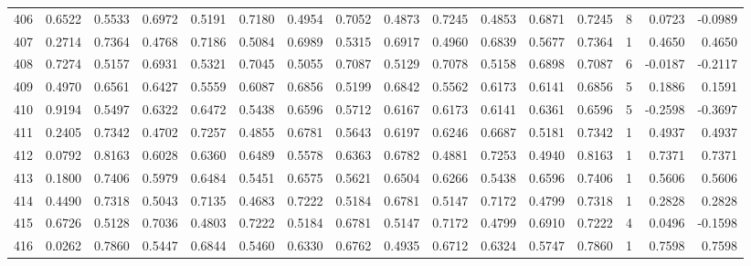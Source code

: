 \begin{tabular}{lrrrrrrrrrrrrrrr}
406 &      0.6522 &  0.5533 &  0.6972 &  0.5191 &  0.7180 &  0.4954 &  0.7052 &  0.4873 &  0.7245 &  0.4853 &   0.6871 &     0.7245 &      8 &                    0.0723 &                    -0.0989 \\
407 &      0.2714 &  0.7364 &  0.4768 &  0.7186 &  0.5084 &  0.6989 &  0.5315 &  0.6917 &  0.4960 &  0.6839 &   0.5677 &     0.7364 &      1 &                    0.4650 &                     0.4650 \\
408 &      0.7274 &  0.5157 &  0.6931 &  0.5321 &  0.7045 &  0.5055 &  0.7087 &  0.5129 &  0.7078 &  0.5158 &   0.6898 &     0.7087 &      6 &                   -0.0187 &                    -0.2117 \\
409 &      0.4970 &  0.6561 &  0.6427 &  0.5559 &  0.6087 &  0.6856 &  0.5199 &  0.6842 &  0.5562 &  0.6173 &   0.6141 &     0.6856 &      5 &                    0.1886 &                     0.1591 \\
410 &      0.9194 &  0.5497 &  0.6322 &  0.6472 &  0.5438 &  0.6596 &  0.5712 &  0.6167 &  0.6173 &  0.6141 &   0.6361 &     0.6596 &      5 &                   -0.2598 &                    -0.3697 \\
411 &      0.2405 &  0.7342 &  0.4702 &  0.7257 &  0.4855 &  0.6781 &  0.5643 &  0.6197 &  0.6246 &  0.6687 &   0.5181 &     0.7342 &      1 &                    0.4937 &                     0.4937 \\
412 &      0.0792 &  0.8163 &  0.6028 &  0.6360 &  0.6489 &  0.5578 &  0.6363 &  0.6782 &  0.4881 &  0.7253 &   0.4940 &     0.8163 &      1 &                    0.7371 &                     0.7371 \\
413 &      0.1800 &  0.7406 &  0.5979 &  0.6484 &  0.5451 &  0.6575 &  0.5621 &  0.6504 &  0.6266 &  0.5438 &   0.6596 &     0.7406 &      1 &                    0.5606 &                     0.5606 \\
414 &      0.4490 &  0.7318 &  0.5043 &  0.7135 &  0.4683 &  0.7222 &  0.5184 &  0.6781 &  0.5147 &  0.7172 &   0.4799 &     0.7318 &      1 &                    0.2828 &                     0.2828 \\
415 &      0.6726 &  0.5128 &  0.7036 &  0.4803 &  0.7222 &  0.5184 &  0.6781 &  0.5147 &  0.7172 &  0.4799 &   0.6910 &     0.7222 &      4 &                    0.0496 &                    -0.1598 \\
416 &      0.0262 &  0.7860 &  0.5447 &  0.6844 &  0.5460 &  0.6330 &  0.6762 &  0.4935 &  0.6712 &  0.6324 &   0.5747 &     0.7860 &      1 &                    0.7598 &                     0.7598 \\

\end{tabular}
